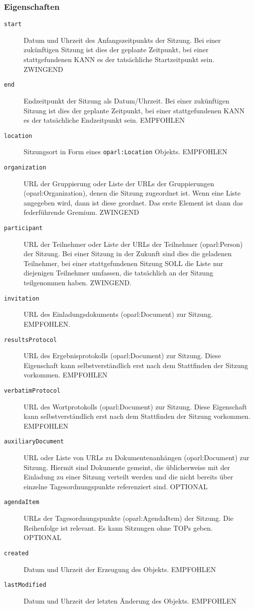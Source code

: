 \documentclass[,a4paper]{article}
\begin{document}
\subsubsection{Eigenschaften}\label{eigenschaften-4}

\begin{description}
\item[\texttt{start}]
Datum und Uhrzeit des Anfangszeitpunkts der Sitzung. Bei einer
zukünftigen Sitzung ist dies der geplante Zeitpunkt, bei einer
stattgefundenen KANN es der tatsächliche Startzeitpunkt sein. ZWINGEND
\item[\texttt{end}]
Endzeitpunkt der Sitzung als Datum/Uhrzeit. Bei einer zukünftigen
Sitzung ist dies der geplante Zeitpunkt, bei einer stattgefundenen KANN
es der tatsächliche Endzeitpunkt sein. EMPFOHLEN
\item[\texttt{location}]
Sitzungsort in Form eines \texttt{oparl:Location} Objekts. EMPFOHLEN
\item[\texttt{organization}]
URL der Gruppierung oder Liste der URLs der Gruppierungen
(oparl:Organization), denen die Sitzung zugeordnet ist. Wenn eine Liste
angegeben wird, dann ist diese geordnet. Das erste Element ist dann das
federführende Gremium. ZWINGEND
\item[\texttt{participant}]
URL der Teilnehmer oder Liste der URLs der Teilnehmer (oparl:Person) der
Sitzung. Bei einer Sitzung in der Zukunft sind dies die geladenen
Teilnehmer, bei einer stattgefundenen Sitzung SOLL die Liste nur
diejenigen Teilnehmer umfassen, die tatsächlich an der Sitzung
teilgenommen haben. ZWINGEND.
\item[\texttt{invitation}]
URL des Einladungsdokuments (oparl:Document) zur Sitzung. EMPFOHLEN.
\item[\texttt{resultsProtocol}]
URL des Ergebnisprotokolls (oparl:Document) zur Sitzung. Diese
Eigenschaft kann selbstverständlich erst nach dem Stattfinden der
Sitzung vorkommen. EMPFOHLEN
\item[\texttt{verbatimProtocol}]
URL des Wortprotokolls (oparl:Document) zur Sitzung. Diese Eigenschaft
kann selbstverständlich erst nach dem Stattfinden der Sitzung vorkommen.
EMPFOHLEN
\item[\texttt{auxiliaryDocument}]
URL oder Liste von URLs zu Dokumentenanhängen (oparl:Document) zur
Sitzung. Hiermit sind Dokumente gemeint, die üblicherweise mit der
Einladung zu einer Sitzung verteilt werden und die nicht bereits über
einzelne Tagesordnungspunkte referenziert sind. OPTIONAL
\item[\texttt{agendaItem}]
URLs der Tagesordnungspunkte (oparl:AgendaItem) der Sitzung. Die
Reihenfolge ist relevant. Es kann Sitzungen ohne TOPs geben. OPTIONAL
\item[\texttt{created}]
Datum und Uhrzeit der Erzeugung des Objekts. EMPFOHLEN
\item[\texttt{lastModified}]
Datum und Uhrzeit der letzten Änderung des Objekts. EMPFOHLEN
\end{description}
\end{document}
